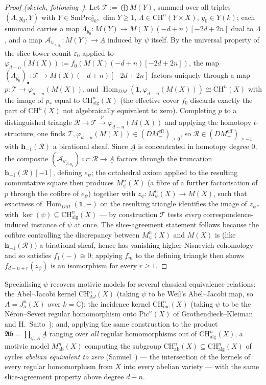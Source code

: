 \documentclass[12pt,a4paper]{article}
\theoremstyle{definition}
\newcommand{\DMeff}{DM^{\mathrm{eff}}_{-}}
\newcommand{\Hom}{\operatorname{Hom}}
\newcommand{\CH}{\mathrm{CH}}
\newcommand{\SmProj}{\mathrm{SmProj}}
\newcommand{\alg}{\mathrm{alg}}
\newcommand{\inc}{\mathrm{inc}}
\newcommand{\ab}{\mathrm{ab}}
\newcommand{\Pic}{\mathrm{Pic}}
\begin{document}
\begin{proof}[Proof (sketch, following~\cite{HerPel25})]
Let $\mathcal T:=\bigoplus M(Y)$, summed over all triples $(\Lambda,y_0,Y)$
with $Y\in\SmProj_k$, $\dim Y\geq1$, $\Lambda\in\CH^n(Y\times X)$,
$y_0\in Y(k)$; each summand carries a map
$\Lambda_{y_0}:M(Y)\to M(X)(-d+n)[-2d+2n]$ dual to $\Lambda$, and a map
$\mathcal A_{\psi_{\Lambda,y_0}}:M(Y)\to\underline A$ induced by $\psi$
itself.  By the universal property of the slice-tower counit
$\varepsilon_0$ applied to $\varphi_{d-n}(M(X)):=f_0(M(X)(-d+n)[-2d+2n])$,
the map $(\Lambda_{y_0})_\bullet:\mathcal T\to
M(X)(-d+n)[-2d+2n]$ factors uniquely through a map
$p:\mathcal T\to\varphi_{d-n}(M(X))$, and
$\Hom_{DM}(\mathbf 1,\varphi_{d-n}(M(X)))\cong\CH^n(X)$ with the image of
$p_\ast$ equal to $\CH^n_{\alg}(X)$ (the effective cover $f_0$ discards
exactly the part of $\CH^n(X)$ not algebraically equivalent to zero).
Completing $p$ to a distinguished triangle $\mathcal R\to\mathcal
T\xrightarrow{p}\varphi_{d-n}(M(X))$ and applying the homotopy
$t$-structure, one finds $\mathcal T,\varphi_{d-n}(M(X))\in(\DMeff)_{\geq0}$,
so $\mathcal R\in(\DMeff)_{\geq-1}$ with $\mathbf h_{-1}(\mathcal R)$ a
birational sheaf.  Since $\underline A$ is concentrated in homotopy degree
$0$, the composite $(\mathcal A_{\psi_{\Lambda,y_0}})\circ r:\mathcal
R\to\underline A$ factors through the truncation
$\mathbf h_{-1}(\mathcal R)[-1]$, defining $e_\psi$; the octahedral axiom
applied to the resulting commutative square then produces
$M^n_\psi(X)$ (a fibre of a further factorisation of $p$ through the
cofibre of $e_\psi$) together with $z_\psi:M^n_\psi(X)\to M(X)$, such that
exactness of $\Hom_{DM}(\mathbf 1,-)$ on the resulting triangle identifies
the image of $z_{\psi\ast}$ with $\ker(\psi)\subseteq\CH^n_{\alg}(X)$ — by
construction $\mathcal T$ tests \emph{every} correspondence-induced instance
of $\psi$ at once.  The slice-agreement statement follows because the
cofibre controlling the discrepancy between $M^n_\psi(X)$ and $M(X)$ is
(like $\mathbf h_{-1}(\mathcal R)$) a birational sheaf, hence has vanishing
higher Nisnevich cohomology and so satisfies $f_1(-)\cong0$; applying $f_m$
to the defining triangle then shows $f_{d-n+r}(z_\psi)$ is an isomorphism
for every $r\geq1$.
\end{proof}

Specialising $\psi$ recovers motivic models for several classical
equivalence relations: the Abel--Jacobi kernel $\CH^n_{AJ}(X)$ (taking
$\psi$ to be Weil's Abel--Jacobi map, so $A=J^n_a(X)$ over $k=\mathbb{C}$); the
incidence kernel $\CH^n_\inc(X)$ (taking $\psi$ to be the Néron--Severi
regular homomorphism onto $\Pic^n(X)$ of Grothendieck--Kleiman and H.\
Saito~\cite{Sai79}); and, applying the same construction to the product
$\underline{\mathfrak{Ab}}=\prod_{\psi,A}\underline A$ ranging over \emph{all}
regular homomorphisms out of $\CH^n_{\alg}(X)$, a motivic model $M^n_{\ab}(X)$
computing the subgroup $\CH^n_{\ab}(X)\subseteq\CH^n_{\alg}(X)$ of cycles
\emph{abelian equivalent to zero} (Samuel~\cite{Sam60}) — the intersection of
the kernels of every regular homomorphism from $X$ into every abelian
variety — with the same slice-agreement property above degree $d-n$.
\end{document}
